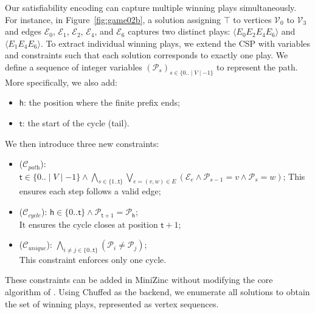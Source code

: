 \documentclass[runningheads]{llncs}
\begin{document}
Our satisfiability encoding can capture multiple winning plays simultaneously. For instance, in Figure~\ref{fig:game02b}, a solution assigning $\top$ to vertices $\mathcal{V}_0$ to $\mathcal{V}_3$ and edges $\mathcal{E}_0$, $\mathcal{E}_1$, $\mathcal{E}_2$, $\mathcal{E}_4$, and $\mathcal{E}_6$ captures two distinct plays: $\langle E_0E_2E_4E_6 \rangle$ and $\langle E_1E_4E_6 \rangle$.
%
To extract individual winning plays, we extend the CSP with variables and constraints such that each solution corresponds to exactly one play. We define a sequence of integer variables $(\mathcal{P}_s)_{s \in \{0..\mid V \mid - 1\}}$ to represent the path. More specifically, we also add:
\begin{itemize}
\item $\mathsf{h}$: the position where the finite prefix ends;

\item $\mathsf{t}$: the start of the cycle (tail).
\end{itemize} 

\noindent 
We then introduce three new constraints:
\begin{itemize}
\item ($\mathcal{C}_{\textit{path}}$): 
$\mathsf{t} \in \{0..\mid V \mid -1\} \wedge \bigwedge_{s \in \{1..\mathsf{t}\}} \bigvee_{e=(v,w) \in E} (\mathcal{E}_e \wedge \mathcal{P}_{s-1} = v \wedge \mathcal{P}_s = w)$;
This ensures each step follows a valid edge;
\end{itemize}

\begin{itemize}
\item ($\mathcal{C}_{\textit{cycle}}$): 
$\mathsf{h} \in \{0..\mathsf{t}\} \wedge \mathcal{P}_{\mathsf{t}+1} = \mathcal{P}_\mathsf{h}$; \\
It ensures the cycle closes at position $\mathsf{t} + 1$;
\end{itemize}

\begin{itemize}
\item ($\mathcal{C}_{\textit{unique}}$): 
$\bigwedge_{i \neq j \in \{0..\mathsf{t}\}} (\mathcal{P}_i \neq \mathcal{P}_j)$; \\
This constraint enforces only one cycle.
\end{itemize} 

These constraints can be added in MiniZinc without modifying the core algorithm of \noc. Using Chuffed as the backend, we enumerate all solutions to obtain the set of winning plays, represented as vertex sequences. 
\end{document}
